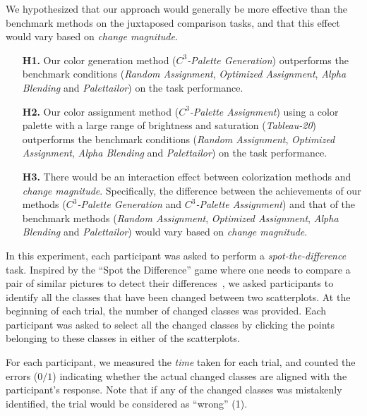 \vspace{.3em}
 We hypothesized that our approach would generally be more effective than the benchmark methods on the juxtaposed comparison tasks, and that this effect would vary based on \emph{change magnitude}.
\begin{itemize}[noitemsep]
\setlength{\itemsep}{5pt}
    \item[\textbf{H1.}] Our color generation method (\emph{$C^3$-Palette Generation}) outperforms the benchmark conditions (\emph{Random Assignment}, \emph{Optimized Assignment}, \emph{Alpha Blending} and \emph{Palettailor}) on the task performance.

    \item [\textbf{H2.}] Our color assignment method (\emph{$C^3$-Palette Assignment}) using a color palette with a large range of brightness and saturation (\emph{Tableau-20}) outperforms the benchmark conditions (\emph{Random Assignment}, \emph{Optimized Assignment}, \emph{Alpha Blending} and \emph{Palettailor}) on the task performance.

    \item [\textbf{H3.}] There would be an interaction effect between colorization methods and \emph{change magnitude}. Specifically, the difference between the achievements of our methods (\emph{$C^3$-Palette Generation} and \emph{$C^3$-Palette Assignment}) and that of the benchmark methods (\emph{Random Assignment}, \emph{Optimized Assignment}, \emph{Alpha Blending} and \emph{Palettailor}) would vary based on \emph{change magnitude}.
\end{itemize}

\vspace{.3em}
In this experiment, each participant was asked to perform a \emph{spot-the-difference} task. Inspired by the ``Spot the Difference'' game where one needs to compare a pair of similar pictures to detect their differences~\cite{Fukuba2009}, we asked participants to identify all the classes that have been changed between two scatterplots. At the beginning of each trial, the number of changed classes was provided. Each participant was asked to select all the changed classes by clicking the points belonging to these classes in either of the scatterplots.

For each participant, we measured the \emph{time} taken for each trial, and counted the errors ($0/1$) indicating whether the actual changed classes are aligned with the participant's response. Note that if any of the changed classes was mistakenly identified, the trial would be considered as ``wrong'' (1).

